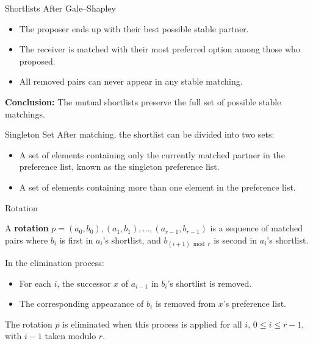 \documentclass[aspectratio=169,xcolor=dvipsnames]{beamer}
\begin{document}
\begin{frame}{Shortlists After Gale--Shapley}
\begin{itemize}
  \item The proposer ends up with their best possible stable partner.
  \pause
  \item The receiver is matched with their most preferred option among those who proposed.\pause
  \item All removed pairs can never appear in any stable matching.
\end{itemize}
\pause
\textbf{Conclusion:} The mutual shortlists preserve the full set of possible stable matchings.
\end{frame}
\begin{frame}{Singleton Set}
    After matching, the shortlist can be divided into two sets:
    \begin{itemize}
        \item A set of elements containing only the currently matched partner in the preference list, known as the singleton preference list.
        \item A set of elements containing more than one element in the preference list.
    \end{itemize}
\end{frame}


\begin{frame}{Rotation}
  \begin{definition}[Rotation]
    A \textbf{rotation} \( p = (a_0, b_0), (a_1, b_1), \dots, (a_{r-1}, b_{r-1}) \) is a sequence of matched pairs where \( b_i \) is first in \( a_i \)'s shortlist, and \( b_{(i+1) \bmod r} \) is second in \( a_i \)'s shortlist.


    
    In the elimination process:
    \begin{itemize}
      \item For each \( i \), the successor \( x \) of \( a_{i-1} \) in \( b_i \)'s shortlist is removed.
      \item The corresponding appearance of \( b_i \) is removed from \( x \)'s preference list.
    \end{itemize}
    The rotation \( p \) is eliminated when this process is applied for all \( i \), \( 0 \leq i \leq r-1 \), with \( i-1 \) taken modulo \( r \).
  \end{definition}
\end{frame}
\end{document}
